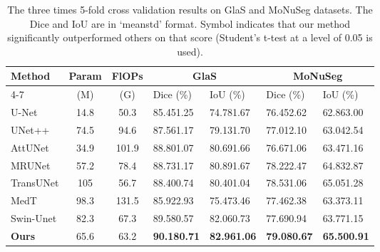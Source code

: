 \documentclass[letterpaper]{article} \usepackage{aaai22}  \usepackage{times}  \usepackage{helvet}  \usepackage{courier}  \usepackage[hyphens]{url}  \usepackage{graphicx} \urlstyle{rm} \def\UrlFont{\rm}  \usepackage{natbib}  \usepackage{caption} \DeclareCaptionStyle{ruled}{labelfont=normalfont,labelsep=colon,strut=off} \frenchspacing  \setlength{\pdfpagewidth}{8.5in}  \setlength{\pdfpageheight}{11in}  \usepackage{algorithm}
\begin{document}
	
	
	
	
	\begin{table}[t]
		\scriptsize
		\centering
		
		\begin{tabular}{@{} l @{\ \ } c @{\ \ } c @{\ \ } l @{\ \ } l @{\ \ } l @{\ \ \ } l@{}}
\toprule
			\multirow{2}{*}{Method} & \multirow{2}{*}{Param} & \multirow{2}{*}{FlOPs}  & \multicolumn{2}{c}{GlaS} & \multicolumn{2}{c}{MoNuSeg} \\ \cmidrule(l){4-7} 
			& (M)  & (G)     &Dice (\%)            & IoU (\%)           & Dice (\%)          & IoU (\%) \\ \midrule
			U-Net      &14.8  &50.3     &85.451.25  &74.781.67  &76.452.62  &62.863.00 \\
			UNet++     &74.5  &94.6     &87.561.17  &79.131.70  &77.012.10  &63.042.54 \\
			AttUNet    &34.9  &101.9    &88.801.07  &80.691.66	&76.671.06	 &63.471.16 \\
			MRUNet     &57.2  &78.4     &88.731.17  &80.891.67	&78.222.47	 &64.832.87\\ 
			TransUNet  &105 &56.7    &88.400.74  &80.401.04	&78.531.06	 &65.051.28 \\
			MedT       &98.3  &131.5    &85.922.93  &75.473.46	&77.462.38	 &63.373.11 \\
			Swin-Unet  &82.3  &67.3    &89.580.57  &82.060.73	&77.690.94	 &63.771.15 \\
			\textbf{Ours} &65.6 &63.2   &\textbf{90.180.71}  &\textbf{82.961.06}	&\textbf{79.080.67}	 &\textbf{65.500.91}
			\\
			\bottomrule
		\end{tabular}
		\caption{ The three times 5-fold cross validation results on GlaS and MoNuSeg datasets. The Dice and IoU are in `meanstd' format. Symbol  indicates that our method significantly outperformed others on that score (Student’s t-test at a level of 0.05 is used).}
		\label{SOTA1}
	\end{table}
	
	
	
\end{document}
